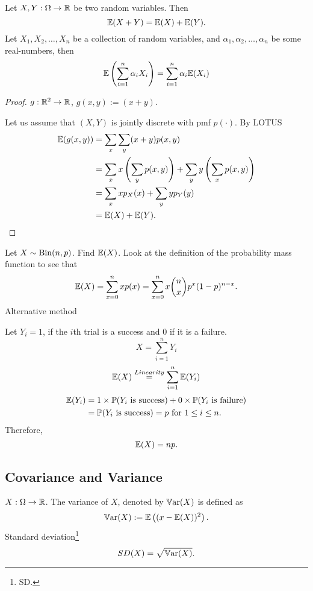 \documentclass[10pt, a4paper]{article}
\begin{document}
\begin{theorem}
    Let $X, Y : \Omega \rightarrow \mathbb{R}$ be two random variables.
    Then
    \[
    \mathbb{E}(X + Y) = \mathbb{E}(X) + \mathbb{E}(Y).
    \]
    Let $X_1, X_2, \dotsc, X_n$ be a collection of random variables,
    and $\alpha_1, \alpha_2, \dotsc, \alpha_n$ be some real-numbers,
    then
    \[
    \mathbb{E}\left(\sum_{i = 1}^{n}\alpha_iX_i\right) = \sum_{i = 1}^{n}\alpha_i\mathbb{E}(X_i)
    \]
    \begin{proof}
        $g : \mathbb{R} ^ 2 \rightarrow \mathbb{R}$,
        $g(x, y) := (x + y)$.

        Let us assume that $(X, Y)$ is jointly discrete with pmf $p(\cdot)$.
        By LOTUS
        \begin{align*}
            \mathbb{E}(g(x, y)) &= \sum_{x}\sum_{y}(x + y)p(x, y) \\
            &= \sum_{x}x\left(\sum_{y}p(x, y)\right) + \sum_{y}y\left(\sum_{x}p(x, y)\right) \\
            &=\sum_{x}xp_X(x) + \sum_{y}yp_Y(y) \\
            &= \mathbb{E}(X) + \mathbb{E}(Y).
        \end{align*}
    \end{proof}
\end{theorem}

\begin{example}
    Let $X \sim \operatorname{Bin}(n, p)$.
    Find $\mathbb{E}(X)$.
    Look at the definition of the probability mass function to see that
    \[
    \mathbb{E}(X) = \sum_{x = 0}^{n} xp(x) = \sum_{x = 0}^{n}x\binom{n}{x}p ^ x(1 - p) ^ {n - x}.
    \]
    Alternative method
    
    Let $Y_i = 1$,
    if the $i$th trial is a success and $0$ if it is a failure.
    \[
    X = \sum_{i = 1}^{n}Y_i
    \]
    \[
    \mathbb{E}(X) \overset{Linearity}{=} \sum_{i = 1}^{n}\mathbb{E}(Y_i)
    \]
    \begin{align*}
        \mathbb{E}(Y_i) &= 1 \times \mathbb{P}(Y_i\text{ is success}) + 0 \times \mathbb{P}(Y_i \text{ is failure}) \\
        &= \mathbb{P}(Y_i\text{ is success}) = p \text{ for } 1 \leq i \leq n.
    \end{align*}
    Therefore,
    \[
    \mathbb{E}(X) = np.
    \]
\end{example}

\subsection{Covariance and Variance}
\begin{definition}
    $X : \Omega \rightarrow \mathbb{R}$.
    The variance of $X$,
    denoted by $\mathbb{V}\mathrm{ar}(X)$ is defined as
    \[
    \mathbb{V}\mathrm{ar}(X) := \mathbb{E}\left((x - \mathbb{E}(X)) ^ 2\right).
    \]
    Standard deviation\footnote{SD.}
    \[
    SD(X) = \sqrt{\mathbb{V}\mathrm{ar}(X)}.
    \]
\end{definition}
\end{document}
